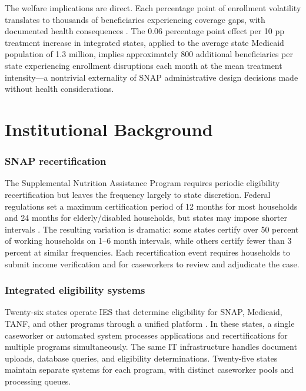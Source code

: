 \documentclass[12pt]{article}
\begin{document}
The welfare implications are direct. Each percentage point of enrollment volatility translates to thousands of beneficiaries experiencing coverage gaps, with documented health consequences \citep{baicker2013}. The 0.06 percentage point effect per 10 pp treatment increase in integrated states, applied to the average state Medicaid population of 1.3 million, implies approximately 800 additional beneficiaries per state experiencing enrollment disruptions each month at the mean treatment intensity---a nontrivial externality of SNAP administrative design decisions made without health considerations.


\section{Institutional Background}

\subsubsection*{SNAP recertification} The Supplemental Nutrition Assistance Program requires periodic eligibility recertification but leaves the frequency largely to state discretion. Federal regulations set a maximum certification period of 12 months for most households and 24 months for elderly/disabled households, but states may impose shorter intervals \citep{usda2024}. The resulting variation is dramatic: some states certify over 50 percent of working households on 1--6 month intervals, while others certify fewer than 3 percent at similar frequencies. Each recertification event requires households to submit income verification and for caseworkers to review and adjudicate the case.

\subsubsection*{Integrated eligibility systems} Twenty-six states operate IES that determine eligibility for SNAP, Medicaid, TANF, and other programs through a unified platform \citep{kff2025}. In these states, a single caseworker or automated system processes applications and recertifications for multiple programs simultaneously. The same IT infrastructure handles document uploads, database queries, and eligibility determinations. Twenty-five states maintain separate systems for each program, with distinct caseworker pools and processing queues.
\end{document}

